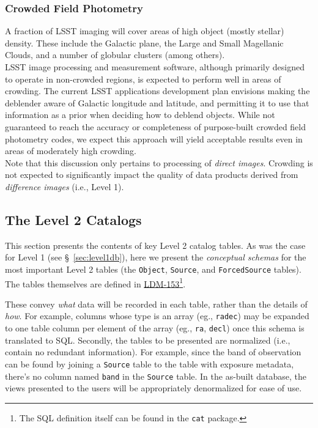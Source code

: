 \documentclass[12pt]{article}
\newcommand{\B}[1]{{\color{blue} #1}}
\newcommand{\code}[1]{\texttt{#1}}
\newcommand{\Object}{\code{Object}\xspace}
\newcommand{\Source}{\code{Source}\xspace}
\newcommand{\ForcedSource}{\code{ForcedSource}\xspace}
\newcommand{\req}[1]{\marginpar{\tiny #1}}
\newcommand{\dmreq}[1]{\req{DMS-REQ-#1}}
\begin{document}
\subsubsection{Crowded Field Photometry}

A fraction of LSST imaging will cover areas of high object (mostly stellar) density. These include the Galactic plane, the Large and Small Magellanic Clouds, and a number of globular clusters (among others).
\\


LSST image processing and measurement software, although primarily designed to operate in non-crowded regions, is expected to perform well in areas of crowding. The current LSST applications development plan envisions making the deblender aware of Galactic longitude and latitude, and permitting it to use that information as a prior when deciding how to deblend objects. While not guaranteed to reach the accuracy or completeness of purpose-built crowded field photometry codes, we expect this approach will yield acceptable results even in areas of moderately high crowding.
\\

Note that this discussion only pertains to processing of \emph{direct images}. Crowding is not expected to significantly impact the quality of data products derived from \emph{difference images} (i.e., Level 1).

\subsection{The Level 2 Catalogs}

This section presents the contents of key Level 2 catalog tables. As was the case for Level 1 (see \S~\ref{sec:level1db}), here we present the \emph{conceptual schemas} for the most important Level 2 tables (the \Object, \Source, and \ForcedSource tables).
\B{The tables themselves are defined in \href{http://ls.st/LDM-153}{LDM-153}\nocite{LDM-153}\footnote{\B{The SQL definition itself can be found in the \texttt{cat} package.}}.}

These convey \emph{what} data will be recorded in each table, rather than the details of \emph{how}. For example, columns whose type is an array (eg., \texttt{radec}) may be expanded to one table column per element of the array (eg., \texttt{ra}, \texttt{decl}) once this schema is translated to SQL. Secondly, the tables to be presented are normalized (i.e., contain no redundant information). For example, since the band of observation can be found by joining a \Source table to the table with exposure metadata, there's no column named \texttt{band} in the \Source table. In the as-built database, the views presented to the users will be appropriately denormalized for ease of use.\dmreq{0332}
\end{document}
